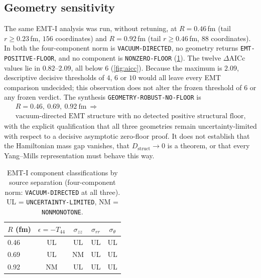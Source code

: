 \documentclass[11pt,a4paper]{article}
\theoremstyle{definition}
\theoremstyle{remark}
\newcommand{\Dstruct}{D_{\mathrm{struct}}}
\begin{document}
\subsection{Geometry sensitivity}\label{ssec:geom}
The same EMT-I analysis was run, without retuning, at $R=0.46$\,fm (tail $r\ge0.23$\,fm, $156$ coordinates) and $R=0.92$\,fm (tail $r\ge0.46$\,fm, $88$ coordinates). In both the four-component norm is \texttt{VACUUM-\allowbreak{}DIRECTED}, no geometry returns \texttt{EMT-\allowbreak{}POSITIVE-\allowbreak{}FLOOR}, and no component is \texttt{NONZERO-\allowbreak{}FLOOR} (\cref{tab:emtcomp}). The twelve $\Delta\mathrm{AICc}$ values lie in $0.82$--$2.09$, all below $6$ (\cref{fig:aicc}). Because the maximum is $2.09$, descriptive decisive thresholds of $4$, $6$ or $10$ would all leave every EMT comparison undecided; this observation does not alter the frozen threshold of $6$ or any frozen verdict. The synthesis \texttt{GEOMETRY-\allowbreak{}ROBUST-\allowbreak{}NO-\allowbreak{}FLOOR} is
\[
\begin{gathered}R=0.46,\ 0.69,\ 0.92\ \text{fm}\ \Longrightarrow\\ \text{vacuum-directed EMT structure with no detected positive structural floor,}\end{gathered}
\]
with the explicit qualification that all three geometries remain uncertainty-limited with respect to a decisive asymptotic zero-floor proof. It does not establish that the Hamiltonian mass gap vanishes, that $\Dstruct\to0$ is a theorem, or that every Yang--Mills representation must behave this way.
\begin{table}[t]
\centering\small
\caption{EMT-I component classifications by source separation (four-component norm: \texttt{VACUUM-\allowbreak{}DIRECTED} at all three). UL = \texttt{UNCERTAINTY-\allowbreak{}LIMITED}, NM = \texttt{NONMONOTONE}.}\label{tab:emtcomp}
\begin{tabular}{@{}lcccc@{}}\toprule $R$ (fm) & $\epsilon=-T_{44}$ & $\sigma_{zz}$ & $\sigma_{rr}$ & $\sigma_\theta$\\\midrule
0.46 & UL & UL & UL & UL\\
0.69 & UL & NM & UL & UL\\
0.92 & NM & UL & UL & UL\\
\bottomrule\end{tabular}
\end{table}
\end{document}
